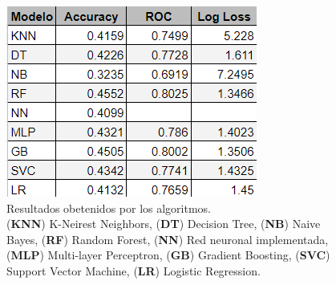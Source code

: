 \documentclass[a4paper,10pt,twocolumn]{article}
\begin{document}
	\begin{figure}[htb]%
		\begin{center}
			\includegraphics{models_metrics.png}
		\end{center}
		\caption{Resultados obetenidos por los algoritmos.\\ (\textbf{KNN}) K-Neirest Neighbors, 
		(\textbf{DT}) Decision Tree, (\textbf{NB}) Naive Bayes, (\textbf{RF}) Random Forest, (\textbf{NN}) Red neuronal implementada,
		(\textbf{MLP}) Multi-layer Perceptron, (\textbf{GB}) Gradient Boosting, (\textbf{SVC}) Support Vector Machine, (\textbf{LR}) Logistic Regression.  \label{results:fig}}%
	\end{figure}


	 
	 

\end{document}
